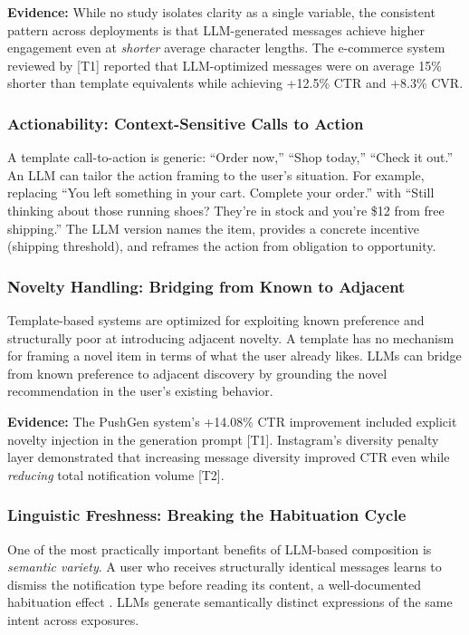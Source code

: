 \documentclass[11pt]{article}
\begin{document}
\textbf{Evidence:} While no study isolates clarity as a single variable, the consistent pattern across deployments is that LLM-generated messages achieve higher engagement even at \textit{shorter} average character lengths. The e-commerce system reviewed by \citet{acm2025ecommerce} [T1] reported that LLM-optimized messages were on average 15\% shorter than template equivalents while achieving +12.5\% CTR and +8.3\% CVR.

\subsubsection{Actionability: Context-Sensitive Calls to Action}

A template call-to-action is generic: ``Order now,'' ``Shop today,'' ``Check it out.'' An LLM can tailor the action framing to the user's situation. For example, replacing ``You left something in your cart. Complete your order.'' with ``Still thinking about those running shoes? They're in stock and you're \$12 from free shipping.'' The LLM version names the item, provides a concrete incentive (shipping threshold), and reframes the action from obligation to opportunity.

\subsubsection{Novelty Handling: Bridging from Known to Adjacent}

Template-based systems are optimized for exploiting known preference and structurally poor at introducing adjacent novelty. A template has no mechanism for framing a novel item in terms of what the user already likes. LLMs can bridge from known preference to adjacent discovery by grounding the novel recommendation in the user's existing behavior.

\textbf{Evidence:} The PushGen system's +14.08\% CTR improvement included explicit novelty injection in the generation prompt \citep{bie2026pushgen} [T1]. Instagram's diversity penalty layer demonstrated that increasing message diversity improved CTR even while \textit{reducing} total notification volume \citep{sun2025ranking} [T2].

\subsubsection{Linguistic Freshness: Breaking the Habituation Cycle}

One of the most practically important benefits of LLM-based composition is \textit{semantic variety}. A user who receives structurally identical messages learns to dismiss the notification type before reading its content, a well-documented habituation effect \citep{ohly2023effects}. LLMs generate semantically distinct expressions of the same intent across exposures.
\end{document}
